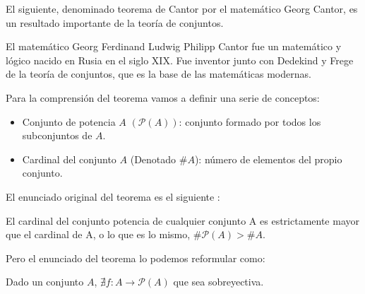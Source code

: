 %
\begin{isabellebody}%
%
%
\isadelimtheory
\isanewline
%
\endisadelimtheory
%
\isatagtheory
%
\endisatagtheory
{\isafoldtheory}%
%
\isadelimtheory
%
\endisadelimtheory
%
\begin{isamarkuptext}%
%
\end{isamarkuptext}\isamarkuptrue%
%
\begin{isamarkuptext}%
%
\end{isamarkuptext}\isamarkuptrue%
%
\begin{isamarkuptext}%
%
\end{isamarkuptext}\isamarkuptrue%
%
\isadelimdocument
%
\endisadelimdocument
%
\isatagdocument
%
\isamarkuptrue%
%
\endisatagdocument
{\isafolddocument}%
%
\isadelimdocument
%
\endisadelimdocument
%
\begin{isamarkuptext}%
El siguiente, denominado  teorema de Cantor por el matemático
 Georg Cantor, es un resultado importante de la teoría
 de conjuntos. 

El matemático Georg Ferdinand Ludwig Philipp Cantor fue un matemático y
lógico nacido en Rusia en el siglo XIX. Fue inventor junto con Dedekind
 y Frege de la teoría de conjuntos, que es la base de las matemáticas
 modernas.


Para la comprensión del teorema vamos a definir una serie de conceptos:

\begin {itemize}

\item Conjunto de potencia $A$  $(\mathcal{P}(A))$: conjunto formado por
todos los subconjuntos de $A$.

\item Cardinal del conjunto $A$ (Denotado $\# A$): número de elementos 
del propio  conjunto.

\end {itemize}
El enunciado original del teorema es el siguiente : 


\begin {teorema}
El cardinal del conjunto potencia de cualquier conjunto A es
 estrictamente mayor que el cardinal de A, o lo que es lo mismo,
$\# \mathcal{P}(A) > \# A.$


\end {teorema}
Pero el enunciado del teorema lo podemos reformular como: 
\begin{teorema}
Dado un conjunto $A$, $\nexists  f : A \longrightarrow \mathcal{P}(A)$ 
que sea sobreyectiva.


\end{teorema}
\end{isamarkuptext}
\end{isabellebody}
